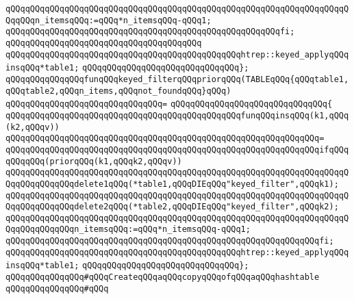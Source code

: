 \verb|qQQqqQQqqQQqqQQqqQQqqQQqqQQqqQQqqQQqqQQqqQQqqQQqqQQqqQQqqQQqqQQqqQQqqQQqqQQqn_itemsqQQq:=qQQq*n_itemsqQQq-qQQq1;|\newline
\verb|qQQqqQQqqQQqqQQqqQQqqQQqqQQqqQQqqQQqqQQqqQQqqQQqqQQqqQQqfi;|\newline
\verb|qQQqqQQqqQQqqQQqqQQqqQQqqQQqqQQqqQQqqQQq|\newline
\verb|qQQqqQQqqQQqqQQqqQQqqQQqqQQqqQQqqQQqqQQqqQQqqQQqhtrep::keyed_applyqQQqinsqQQq*table1;|\newline
\verb|qQQqqQQqqQQqqQQqqQQqqQQqqQQqqQQq};|\newline
\newline
\verb|qQQqqQQqqQQqqQQqfunqQQqkeyed_filterqQQqpriorqQQq(TABLEqQQq{qQQqtable1,qQQqtable2,qQQqn_items,qQQqnot_foundqQQq}qQQq)|\newline
\verb|qQQqqQQqqQQqqQQqqQQqqQQqqQQqqQQq=|\newline
\verb|qQQqqQQqqQQqqQQqqQQqqQQqqQQqqQQq{|\newline
\verb|qQQqqQQqqQQqqQQqqQQqqQQqqQQqqQQqqQQqqQQqqQQqqQQqfunqQQqinsqQQq(k1,qQQq(k2,qQQqv))|\newline
\verb|qQQqqQQqqQQqqQQqqQQqqQQqqQQqqQQqqQQqqQQqqQQqqQQqqQQqqQQqqQQqqQQq=|\newline
\verb|qQQqqQQqqQQqqQQqqQQqqQQqqQQqqQQqqQQqqQQqqQQqqQQqqQQqqQQqqQQqqQQqifqQQqqQQqqQQq(priorqQQq(k1,qQQqk2,qQQqv))|\newline
\verb|qQQqqQQqqQQqqQQqqQQqqQQqqQQqqQQqqQQqqQQqqQQqqQQqqQQqqQQqqQQqqQQqqQQqqQQqqQQqqQQqqQQqdelete1qQQq(*table1,qQQqDIEqQQq"keyed_filter",qQQqk1);|\newline
\verb|qQQqqQQqqQQqqQQqqQQqqQQqqQQqqQQqqQQqqQQqqQQqqQQqqQQqqQQqqQQqqQQqqQQqqQQqqQQqqQQqqQQqdelete2qQQq(*table2,qQQqDIEqQQq"keyed_filter",qQQqk2);|\newline
\verb|qQQqqQQqqQQqqQQqqQQqqQQqqQQqqQQqqQQqqQQqqQQqqQQqqQQqqQQqqQQqqQQqqQQqqQQqqQQqqQQqqQQqn_itemsqQQq:=qQQq*n_itemsqQQq-qQQq1;|\newline
\verb|qQQqqQQqqQQqqQQqqQQqqQQqqQQqqQQqqQQqqQQqqQQqqQQqqQQqqQQqqQQqqQQqfi;|\newline
\newline
\verb|qQQqqQQqqQQqqQQqqQQqqQQqqQQqqQQqqQQqqQQqqQQqqQQqhtrep::keyed_applyqQQqinsqQQq*table1;|\newline
\verb|qQQqqQQqqQQqqQQqqQQqqQQqqQQqqQQq};|\newline
\newline
\verb|qQQqqQQqqQQqqQQq#qQQqCreateqQQqaqQQqcopyqQQqofqQQqaqQQqhashtable|\newline
\verb|qQQqqQQqqQQqqQQq#qQQq|\newline
